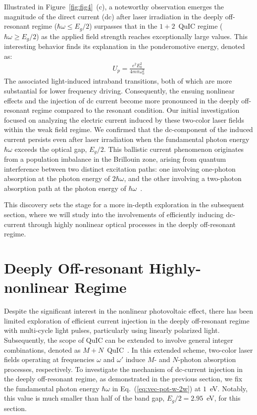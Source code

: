  Illustrated in Figure~\ref{fig:fig4}~(c), a noteworthy observation emerges the magnitude of the direct current (dc) after laser irradiation in the deeply off-resonant regime ($\hbar \omega \le E_g/2$) surpasses that in the $1+2$~\gls{QuIC} regime ($\hbar \omega \ge E_g/2$) as the applied field strength reaches exceptionally large values. This interesting behavior finds its explanation in the ponderomotive energy, denoted as:
 \begin{align}
 U_p=\frac{e^2E^2_0}{4m\pi \omega_0^2}    
 \end{align}
 The associated light-induced intraband transitions, both of which are more substantial for lower frequency driving\cite{PhysRevB.98.035202}. Consequently, the ensuing nonlinear effects and the injection of dc current become more pronounced in the deeply off-resonant regime compared to the resonant condition. 
Our initial investigation focused on analyzing the electric current induced by these two-color laser fields within the weak field regime. We confirmed that the dc-component of the induced current persists even after laser irradiation when the fundamental photon energy $\hbar \omega$ exceeds the optical gap, $E_g/2$. This ballistic current phenomenon originates from a population imbalance in the Brillouin zone, arising from quantum interference between two distinct excitation paths: one involving one-photon absorption at the photon energy of $2\hbar \omega$, and the other involving a two-photon absorption path at the photon energy of $\hbar \omega$~\cite{PhysRevLett.74.3596,PhysRevLett.76.1703,PhysRevLett.78.306}.


 This discovery sets the stage for a more in-depth exploration in the subsequent section, where we will study into the involvements of efficiently inducing dc-current through highly nonlinear optical processes in the deeply off-resonant regime.


\section{Deeply Off-resonant Highly-nonlinear Regime \label{sec:nonperturbative}}

Despite the significant interest in the nonlinear photovoltaic effect, there has been limited exploration of efficient current injection in the deeply off-resonant regime with multi-cycle light pulses, particularly using linearly polarized light. Subsequently, the scope of \gls{QuIC} can be extended to involve general integer combinations, denoted as $M+N$~\gls{QuIC}~\cite{PhysRevB.100.075202,PhysRevLett.123.067402}. In this extended scheme, two-color laser fields operating at frequencies $\omega$ and $\omega'$ induce $M$- and $N$-photon absorption processes, respectively.
To investigate the mechanism of dc-current injection in the deeply off-resonant regime, as demonstrated in the previous section, we fix the fundamental photon energy $\hbar \omega$ in Eq.~(\ref{eq:vec-pot-w-2w}) at $1$~eV. Notably, this value is much smaller than half of the band gap, $E_g/2=2.95$~eV, for this section.

